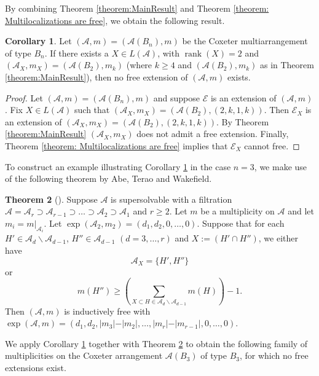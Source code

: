 \documentclass[12pt]{amsart}
\theoremstyle{definition}
\newtheorem{theorem}{Theorem}[section]
\newtheorem{corollary}[theorem]{Corollary}
\theoremstyle{remark}
\newcommand{\rank}{\operatorname{rank}}
\newcommand\CA{{\mathscr A}}
\newcommand\CE{{\mathscr E}}
\begin{document}
By combining Theorem \ref{theorem:MainResult} and Theorem \ref{theorem: Multilocalizations are free}, we obtain the following result. 

\begin{corollary}\label{corollary: implications for higher Bn}
    Let $(\CA,m)=(\CA(B_n),m)$ be the Coxeter multiarrangement of type $B_n$. If there exists a $X\in L(\CA)$, with $\rank(X)=2$ and $(\CA_X,m_X)=(\CA(B_2),m_k)$ (where $k\geq 4$ and $(\CA(B_2),m_k)$ as in Theorem \ref{theorem:MainResult}), then no free extension of $(\CA,m)$ exists.
\end{corollary}

\begin{proof}
    Let $(\CA,m)=(\CA(B_n),m)$ and suppose $\CE$ is an extension of $(\CA,m)$. Fix $X \in L(\CA)$ such that $(\CA_X,m_X)=(\CA(B_2),(2,k,1,k))$. Then $\CE_X$ is an extension of $(\CA_X,m_X)=(\CA(B_2),(2,k,1,k))$. By Theorem \ref{theorem:MainResult} $(\CA_X,m_X)$ does not admit a free extension. Finally, Theorem \ref{theorem: Multilocalizations are free} implies that $\CE_X$ cannot free.
\end{proof}

To construct an example illustrating Corollary \ref{corollary: implications for higher Bn} in the case $n=3$, we make use of the following theorem by Abe, Terao and Wakefield.

\begin{theorem}[{\cite[Thm.~5.10]{MR2400395}}]\label{theorem: free vertex}
Suppose $\CA$ is supersolvable with a filtration $\CA=\CA_r\supset\CA_{r-1}\supset\dots\supset\CA_2\supset\CA_1$ and $r\geq 2$.
Let $m$ be a multiplicity on $\CA$ and let $m_i = m\vert_{\CA_i}$. Let $\exp(\CA_2,m_2)=(d_1,d_2,0,\dots,0)$. Suppose that for each $H'\in \CA_d\backslash \CA_{d-1}$, $H''\in\CA_{d-1}$ $(d=3,\dots,r)$ and $X:=(H'\cap H'')$, we either have $$\CA_X=\{H',H''\}$$ or 
$$m(H'')\geq\left(\sum_{X\subset H\in \CA_d\backslash\CA_{d-1}}m(H)\right)-1.$$ Then $(\CA,m)$ is inductively free with $\exp(\CA,m)=(d_1,d_2,\vert m_3\vert-\vert m_2\vert,\dots,\vert m_r\vert-\vert m_{r-1}\vert,0,\dots,0)$.
\end{theorem}

We apply Corollary \ref{corollary: implications for higher Bn} together with Theorem \ref{theorem: free vertex} to obtain the following family of multiplicities on the Coxeter arrangement $\CA(B_3)$ of type $B_3$, for which no free extensions exist.
\end{document}
